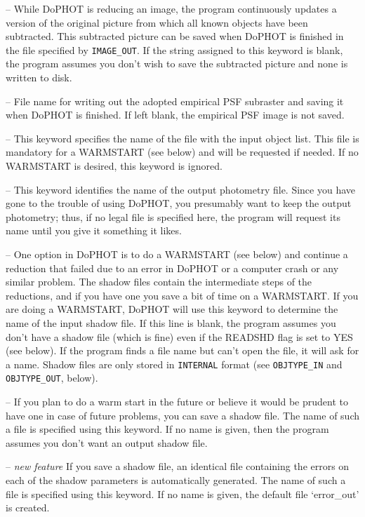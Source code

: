  -- While DoPHOT is reducing an image, the
program continuously 
updates a version of the original picture from which all known objects
have been subtracted.  This subtracted picture can be saved when
DoPHOT is finished in the file specified by {\tt IMAGE\_OUT}.
If the string assigned to this keyword is blank,
the program assumes you don't wish to save the subtracted 
picture and none is written to disk.

 -- File name for writing out the adopted 
empirical PSF subraster and saving it when DoPHOT is finished.
If left blank, the empirical PSF image is not saved.

 -- This keyword specifies the name of
the file with the input object list.  This file is mandatory 
for a WARMSTART (see below) and will be requested if needed. 
If no WARMSTART is desired, this keyword is ignored.

 -- This keyword identifies the name
of the output photometry file.  Since you have gone to the
trouble of using DoPHOT, you
presumably want to keep the output photometry; thus, if no legal file is 
specified here, the program will request its name until you
give it something it likes. 

 -- One option in DoPHOT is to 
do a WARMSTART (see below) and continue a reduction that 
failed due to an error in DoPHOT or a computer crash or
any similar problem.  The shadow files contain the intermediate
steps of the reductions, and if you have one you save a bit
of time on a WARMSTART.  If you are doing a WARMSTART, DoPHOT
will use this keyword to determine the name of the input
shadow file.  If this line is blank, the program assumes you 
don't have a shadow file (which is fine) even if the READSHD
flag is set to YES (see below).   If the program
finds a file name but can't open the file, it will ask for 
a name.  Shadow files are only stored in {\tt INTERNAL} format
(see {\tt OBJTYPE\_IN} and {\tt OBJTYPE\_OUT}, below).

 --  If you plan to do a warm
start in the future or believe it would be prudent to have one
in case of future problems, you can save a shadow file.  The name
of such a file 
is specified using this keyword.  If no name is given, then
the program assumes you don't want an output shadow file.

 -- {\it new feature} If you save a 
shadow file, an identical file containing the errors on each of the 
shadow parameters is automatically generated.  The name of such 
a file is specified using this keyword.  If no name is given, the default 
file `error\_out' is created.

